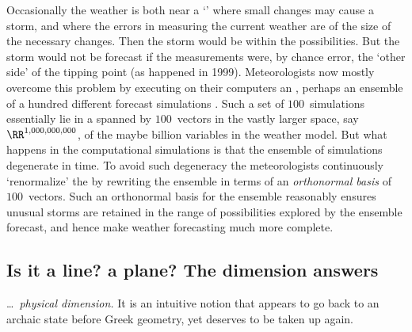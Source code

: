 Occasionally the weather is both near a `' where small changes may cause a storm, and where the errors in measuring the current weather are of the size of the necessary changes.
Then the storm would be within the possibilities. 
But the storm would not be forecast if the measurements were, by chance error, the `other side' of the tipping point (as happened in 1999).
Meteorologists now mostly overcome this problem by executing on their computers an , perhaps an ensemble of a hundred different forecast simulations \cite[pp.274--80, e.g.]{Roulstone2013}.
Such a set of \(100\)~simulations essentially lie in a  spanned by \(100\)~vectors in the vastly larger space, say~\(\RR^{1,000,000,000}\), of the maybe billion variables in the weather model.
But what happens in the computational simulations is that the ensemble of simulations degenerate in time.
To avoid such degeneracy the meteorologists continuously `renormalize' the  by rewriting the ensemble in terms of an \emph{orthonormal basis} of \(100\)~vectors.
Such an orthonormal basis for the ensemble reasonably ensures unusual storms are retained in the range of possibilities explored by the ensemble forecast, and hence make weather forecasting much more complete.





\subsection{Is it a line? a plane? The dimension answers}


\begin{quoted}{\cite{Mandelbrot1982}}
\ldots\ \emph{physical dimension.} It is an intuitive notion that appears to go back to an archaic state before Greek geometry, yet deserves to be taken up again.
\end{quoted}

